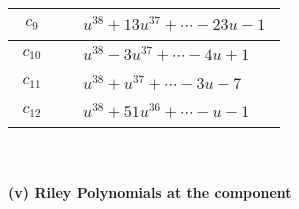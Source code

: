 \documentclass[1p]{elsarticle_modified}
\theoremstyle{definition}
\begin{document}
\begin{tabular}{m{50pt}|m{274pt}}
\hline $$\begin{aligned}c_{9}\end{aligned}$$&$\begin{aligned}
&u^{38}+13 u^{37}+\cdots-23 u-1
\end{aligned}$\\
\hline $$\begin{aligned}c_{10}\end{aligned}$$&$\begin{aligned}
&u^{38}-3 u^{37}+\cdots-4 u+1
\end{aligned}$\\
\hline $$\begin{aligned}c_{11}\end{aligned}$$&$\begin{aligned}
&u^{38}+u^{37}+\cdots-3 u-7
\end{aligned}$\\
\hline $$\begin{aligned}c_{12}\end{aligned}$$&$\begin{aligned}
&u^{38}+51 u^{36}+\cdots- u-1
\end{aligned}$\\
\hline
\end{tabular}\\~\\
\newpage\renewcommand{\arraystretch}{1}
\flushleft \textbf{(v) Riley Polynomials at the component}\newline \\
\end{document}
